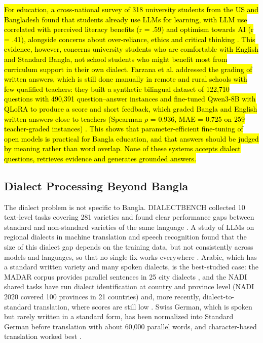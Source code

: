 \hl{For education, a cross-national survey of 318 university students
from the US and Bangladesh found that students already use LLMs for
learning, with LLM use correlated with perceived literacy benefits (r =
.59) and optimism towards AI (r = .41), alongside concerns about
over-reliance, ethics and critical thinking \cite{hossain2025ailiteracy}. This evidence,
however, concerns university students who are comfortable with English
and Standard Bangla, not school students who might benefit most from
curriculum support in their own dialect. Farzana et al. addressed the
grading of written answers, which is still done manually in remote and
rural schools with few qualified teachers: they built a synthetic
bilingual dataset of 122,710 questions with 490,391 question--answer
instances and fine-tuned Qwen3-8B with QLoRA to produce a score and
short feedback, which graded Bangla and English written answers close to
teachers (Spearman \ensuremath{\rho} = 0.936, MAE = 0.725 on 259 teacher-graded
instances) \cite{farzana2026semantic}. This shows that parameter-efficient fine-tuning of
open models is practical for Bangla education, and that answers should
be judged by meaning rather than word overlap. None of these systems
accepts dialect questions, retrieves evidence and generates grounded
answers.}

\subsection{Dialect Processing Beyond Bangla}\label{dialect-processing-beyond-bangla}

The dialect problem is not specific to Bangla. DIALECTBENCH collected
10 text-level tasks covering 281 varieties and found clear performance
gaps between standard and non-standard varieties of the same language
\cite{faisal2024dialectbench}. A study of LLMs on regional dialects in
machine translation and speech recognition found that the size of this
dialect gap depends on the training data, but not consistently across
models and languages, so that no single fix works everywhere
\cite{kantharuban2023dialectgap}. Arabic, which has a standard written
variety and many spoken dialects, is the best-studied case: the MADAR
corpus provides parallel sentences in 25 city dialects
\cite{bouamor2018madar}, and the NADI shared tasks have run dialect
identification at country and province level (NADI 2020 covered 100
provinces in 21 countries) \cite{abdulmageed2020nadi} and, more recently,
dialect-to-standard translation, where scores are still low
\cite{abdulmageed2023nadi}. Swiss German, which is spoken but rarely
written in a standard form, has been normalized into Standard German
before translation with about 60,000 parallel words, and character-based
translation worked best \cite{honnet2018swissgerman}.


